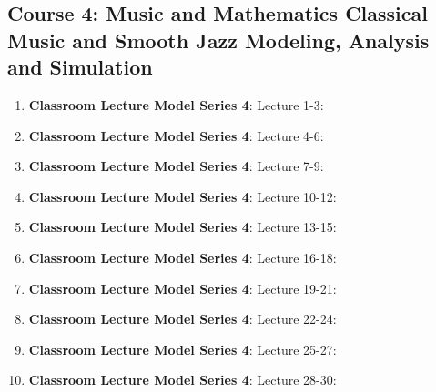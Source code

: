 \documentclass{ResumeDesignFormat1}
\begin{document}
\subsection{Course 4: Music and Mathematics Classical Music and Smooth Jazz Modeling, Analysis and Simulation}

\begin{enumerate}
\item \textbf{Classroom Lecture Model Series 4}: \textcolor{c2}{Lecture 1-3:}
\item \textbf{Classroom Lecture Model Series 4}: \textcolor{c2}{Lecture 4-6:}
\item \textbf{Classroom Lecture Model Series 4}: \textcolor{c2}{Lecture 7-9:}
\item \textbf{Classroom Lecture Model Series 4}: \textcolor{c2}{Lecture 10-12:}
\item \textbf{Classroom Lecture Model Series 4}: \textcolor{c2}{Lecture 13-15:}
\item \textbf{Classroom Lecture Model Series 4}: \textcolor{c2}{Lecture 16-18:}
\item \textbf{Classroom Lecture Model Series 4}: \textcolor{c2}{Lecture 19-21:}
\item \textbf{Classroom Lecture Model Series 4}: \textcolor{c2}{Lecture 22-24:}
\item \textbf{Classroom Lecture Model Series 4}: \textcolor{c2}{Lecture 25-27:}
\item \textbf{Classroom Lecture Model Series 4}: \textcolor{c2}{Lecture 28-30:}
\end{enumerate}
\end{document}
